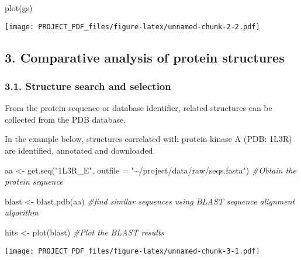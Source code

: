 \documentclass[
]{article}
\newenvironment{Shaded}{\begin{snugshade}}{\end{snugshade}}
\newcommand{\AttributeTok}[1]{\textcolor[rgb]{0.77,0.63,0.00}{#1}}
\newcommand{\CommentTok}[1]{\textcolor[rgb]{0.56,0.35,0.01}{\textit{#1}}}
\newcommand{\FunctionTok}[1]{\textcolor[rgb]{0.00,0.00,0.00}{#1}}
\newcommand{\NormalTok}[1]{#1}
\newcommand{\OtherTok}[1]{\textcolor[rgb]{0.56,0.35,0.01}{#1}}
\newcommand{\StringTok}[1]{\textcolor[rgb]{0.31,0.60,0.02}{#1}}
\begin{document}
\begin{Shaded}
\begin{Highlighting}[]
\FunctionTok{plot}\NormalTok{(gs)}
\end{Highlighting}
\end{Shaded}

\texttt{[image: PROJECT\_PDF\_files/figure-latex/unnamed-chunk-2-2.pdf]}

\hypertarget{comparative-analysis-of-protein-structures}{%
\subsection{3. Comparative analysis of protein
structures}\label{comparative-analysis-of-protein-structures}}

\hypertarget{structure-search-and-selection}{%
\subsubsection{3.1. Structure search and
selection}\label{structure-search-and-selection}}

From the protein sequence or database identifier, related structures can
be collected from the PDB database.

In the example below, structures correlated with protein kinase A (PDB:
1L3R) are identified, annotated and downloaded.

\begin{Shaded}
\begin{Highlighting}[]
\NormalTok{aa }\OtherTok{\textless{}{-}} \FunctionTok{get.seq}\NormalTok{(}\StringTok{"1L3R\_E"}\NormalTok{, }\AttributeTok{outfile =} \StringTok{"\textasciitilde{}/project/data/raw/seqs.fasta"}\NormalTok{) }\CommentTok{\#Obtain the protein sequence}

\NormalTok{blast }\OtherTok{\textless{}{-}} \FunctionTok{blast.pdb}\NormalTok{(aa) }\CommentTok{\#find similar sequences using BLAST sequence alignment algorithm}

\NormalTok{hits }\OtherTok{\textless{}{-}} \FunctionTok{plot}\NormalTok{(blast) }\CommentTok{\#Plot the BLAST results}
\end{Highlighting}
\end{Shaded}

\texttt{[image: PROJECT\_PDF\_files/figure-latex/unnamed-chunk-3-1.pdf]}
\end{document}

